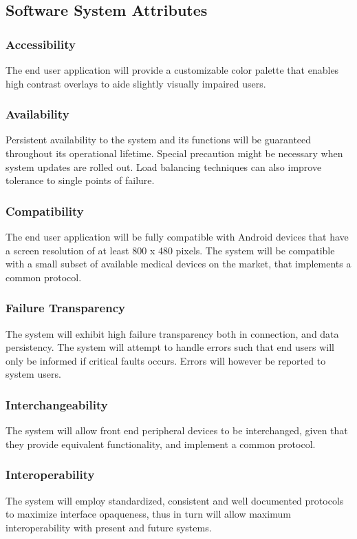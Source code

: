\subsection{Software System Attributes}

\subsubsection{Accessibility}
The end user application will provide a customizable color palette that enables high contrast overlays to aide slightly visually impaired users.

\subsubsection{Availability}
Persistent availability to the system and its functions will be guaranteed throughout its operational lifetime. Special precaution might be necessary when system updates are rolled out. Load balancing techniques can also improve tolerance to single points of failure.

\subsubsection{Compatibility}
The end user application will be fully compatible with Android devices that have a screen resolution of at least 800 x 480 pixels. The system will be compatible with a small subset of available medical devices on the market, that implements a common protocol.

\subsubsection{Failure Transparency}
The system will exhibit high failure transparency both in connection, and data persistency. The system will attempt to handle errors such that end users will only be informed if critical faults occurs. Errors will however be reported to system users.

\subsubsection{Interchangeability}
The system will allow front end peripheral devices to be interchanged, given that they provide equivalent functionality, and implement a common protocol.

\subsubsection{Interoperability}
The system will employ standardized, consistent and well documented protocols to maximize interface opaqueness, thus in turn will allow maximum interoperability with present and future systems.

